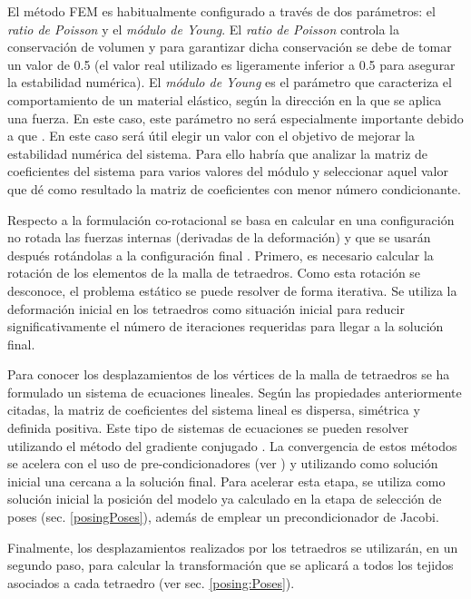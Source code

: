 El método \ac{FEM} es habitualmente configurado a través de dos parámetros: el \emph{ratio de Poisson} y el \emph {módulo de Young}. El \emph{ratio de Poisson} controla la conservación de volumen y para garantizar dicha conservación se debe de tomar un valor de 0.5 (el valor real utilizado es ligeramente inferior a 0.5 para asegurar la estabilidad numérica). El \emph {módulo de Young} es el parámetro que caracteriza el comportamiento de un material elástico, según la dirección en la que se aplica una fuerza. En este caso, este parámetro no será especialmente importante debido a que . En este caso será útil elegir un valor con el objetivo de mejorar la estabilidad numérica del sistema. Para ello habría que analizar la matriz de coeficientes del sistema para varios valores del módulo y seleccionar aquel valor que dé como resultado la matriz de coeficientes con menor número condicionante.

Respecto a la formulación co-rotacional se basa en calcular en una configuración no rotada las fuerzas internas (derivadas de la deformación) y que se usarán después rotándolas a la configuración final \cite{Muller2004}. Primero, es necesario calcular la rotación  de los elementos de la malla de tetraedros. Como esta rotación se desconoce, el problema estático se puede resolver de forma iterativa. Se utiliza la deformación inicial en los tetraedros como situación inicial para reducir significativamente el número de iteraciones requeridas para llegar a la solución final.  %

Para conocer los desplazamientos de los vértices de la malla de tetraedros se ha formulado un sistema de ecuaciones lineales. Según las propiedades anteriormente citadas, la matriz de coeficientes del sistema lineal es dispersa, simétrica y definida positiva. Este tipo de sistemas de ecuaciones se pueden resolver utilizando el método del gradiente conjugado \cite{Press2007}. La convergencia de estos métodos se acelera con el uso de pre-condicionadores (ver \cite{hauth2003}) y utilizando como solución inicial una cercana a la solución final. Para acelerar esta etapa, se utiliza  como solución inicial la posición del modelo ya calculado en la etapa de selección de poses (sec. \ref{posingPoses}), además de emplear un precondicionador de Jacobi.

Finalmente, los desplazamientos realizados por los tetraedros se utilizarán, en un segundo paso, para calcular la transformación que se aplicará a todos los tejidos asociados a cada tetraedro (ver sec. \ref{posing:Poses}). 



